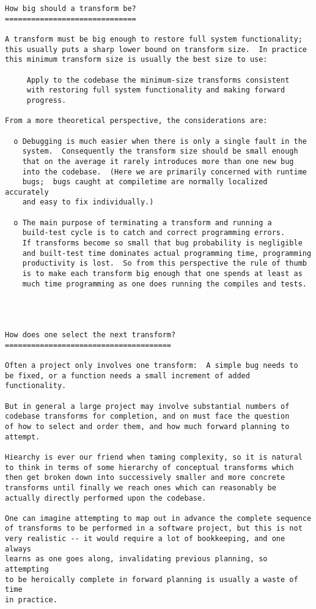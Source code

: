 \begin{verbatim}
How big should a transform be?
==============================

A transform must be big enough to restore full system functionality;
this usually puts a sharp lower bound on transform size.  In practice
this minimum transform size is usually the best size to use:

     Apply to the codebase the minimum-size transforms consistent
     with restoring full system functionality and making forward
     progress.

From a more theoretical perspective, the considerations are:

  o Debugging is much easier when there is only a single fault in the
    system.  Consequently the transform size should be small enough
    that on the average it rarely introduces more than one new bug
    into the codebase.  (Here we are primarily concerned with runtime
    bugs;  bugs caught at compiletime are normally localized accurately
    and easy to fix individually.)

  o The main purpose of terminating a transform and running a
    build-test cycle is to catch and correct programming errors.
    If transforms become so small that bug probability is negligible
    and built-test time dominates actual programming time, programming
    productivity is lost.  So from this perspective the rule of thumb
    is to make each transform big enough that one spends at least as
    much time programming as one does running the compiles and tests.




How does one select the next transform?
======================================

Often a project only involves one transform:  A simple bug needs to
be fixed, or a function needs a small increment of added functionality.

But in general a large project may involve substantial numbers of
codebase transforms for completion, and on must face the question
of how to select and order them, and how much forward planning to
attempt.

Hiearchy is ever our friend when taming complexity, so it is natural
to think in terms of some hierarchy of conceptual transforms which
then get broken down into successively smaller and more concrete
transforms until finally we reach ones which can reasonably be
actually directly performed upon the codebase.

One can imagine attempting to map out in advance the complete sequence
of transforms to be performed in a software project, but this is not
very realistic -- it would require a lot of bookkeeping, and one always
learns as one goes along, invalidating previous planning, so attempting
to be heroically complete in forward planning is usually a waste of time
in practice.


\end{verbatim}
